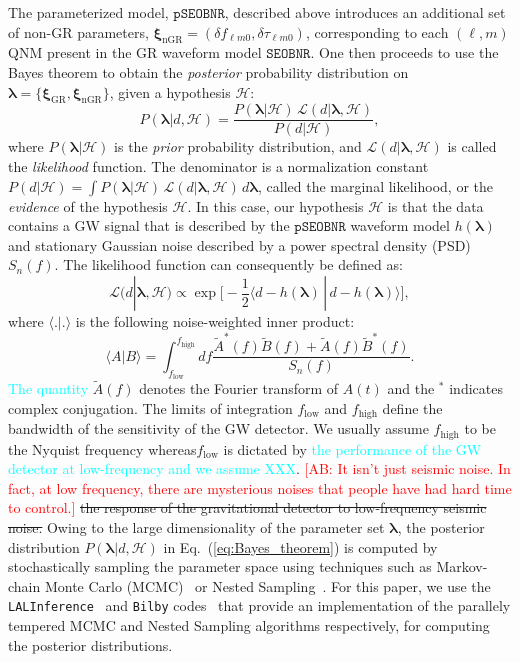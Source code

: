 \documentclass[twocolumn,prd,aps,superscriptaddress,preprintnumbers,tightenlines,showpacs,nofootinbib,eqsecnum,amsfonts,amsmath]{revtex4-1}
\newcommand{\ab}[1]{\textcolor{cyan}{#1}}
\newcommand{\comment}[1]{\textcolor{red}{[#1]}}
\newcommand{\blambda}{\bm{\lambda}}
\newcommand{\bxigr}{\bm{\xi}_{\text{GR}}}
\newcommand{\bxingr}{\bm{\xi}_{\text{nGR}}}
\newcommand{\pSEOB}{\texttt{pSEOBNR}}
\newcommand{\SEOB}{\texttt{SEOBNR}}
\begin{document}
The parameterized model, $\pSEOB$, described above introduces an additional set of non-GR parameters, $\bxingr = (\delta f_{\ell m 0},\delta \tau_{\ell m 0})$, corresponding to each $(\ell,m)$ QNM present in the GR waveform model $\SEOB$. One then proceeds to use the Bayes theorem to obtain the \emph{posterior} probability distribution on $\blambda = \{\bxigr, \bxingr\}$, given a hypothesis $\mathcal{H}$:
%
\begin{equation}
P(\blambda | d, \mathcal{H}) = \frac{P(\blambda | \mathcal{H}) \, \mathcal{L}(d | \blambda, \mathcal{H})}{P(d|\mathcal{H})},
\label{eq:Bayes_theorem}
\end{equation}
%
where $P(\blambda | \mathcal{H})$ is the \emph{prior} probability distribution, and $\mathcal{L}(d | \blambda, \mathcal{H})$ is called the \emph{likelihood} function. The denominator is a normalization constant $P(d|\mathcal{H}) = \int P(\blambda | \mathcal{H}) \, \mathcal{L}(d | \blambda, \mathcal{H}) \, d\blambda$, called the marginal likelihood, or the \emph{evidence} of the hypothesis $\mathcal{H}$. In this case, our hypothesis $\mathcal{H}$ is that the data contains a GW signal that is described by the $\pSEOB$ waveform model $h(\blambda)$  and stationary Gaussian noise described by a power spectral density (PSD) $S_n(f)$. The likelihood function can consequently be defined as:
%
\begin{equation}
\mathcal{L}(d | \blambda, \mathcal{H}) \propto \exp\big[-\frac{1}{2} \langle d - h(\blambda) \, | \, d -h(\blambda) \rangle \big],
\label{eq:likelihood}
\end{equation}
%
where $\langle . | . \rangle$ is the following noise-weighted inner product:
%
\begin{equation}
\langle A | B \rangle = \int_{f_\mathrm{low}} ^{f_\mathrm{high}} df \frac{\tilde{A}^*(f)\tilde{B}(f) + \tilde{A}(f)\tilde{B}^*(f)}{S_n(f)}.
\label{eq:nwip}
\end{equation}
%
\ab{The quantity} $\tilde{A}(f)$ denotes the Fourier transform of $A(t)$ and the $^*$ indicates complex conjugation. The limits of integration ${f_\mathrm{low}}$ and ${f_\mathrm{high}}$ define the bandwidth of the sensitivity of the GW detector. We usually assume ${f_\mathrm{high}}$ to be the Nyquist frequency whereas${f_\mathrm{low}}$ is dictated by \ab{the performance of the 
GW detector at low-frequency and we assume XXX}. \comment{AB: It isn't just seismic noise. In fact, at low frequency, there are mysterious noises that people have had hard time 
to control.} \sout{the response of the gravitational detector to low-frequency seismic noise.} Owing to the large dimensionality of the parameter set $\blambda$, the posterior distribution $P(\blambda | d, \mathcal{H})$ in Eq.~(\ref{eq:Bayes_theorem}) is computed by stochastically sampling the parameter space using techniques such as Markov-chain Monte Carlo (MCMC)~\cite{} or Nested Sampling~\cite{}. For this paper, we use the \verb+LALInference+~\cite{} and \verb+Bilby+ codes~\cite{} that provide an implementation of the parallely tempered MCMC and Nested Sampling algorithms respectively, for computing the posterior distributions. 
\end{document}
